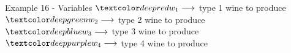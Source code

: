 \begin{frame}{Example 16 - Variables}
\Large{
$\colora{{w}_{1}} \longrightarrow$
    type 1 wine to produce \\ \vspace{1cm}
$\colorb{{w}_{2}} \longrightarrow$
    type 2 wine to produce \\ \vspace{1cm}
$\colorc{{w}_{3}} \longrightarrow$
    type 3 wine to produce \\ \vspace{1cm}
$\colord{{w}_{4}} \longrightarrow$
    type 4 wine to produce
}
\end{frame}
